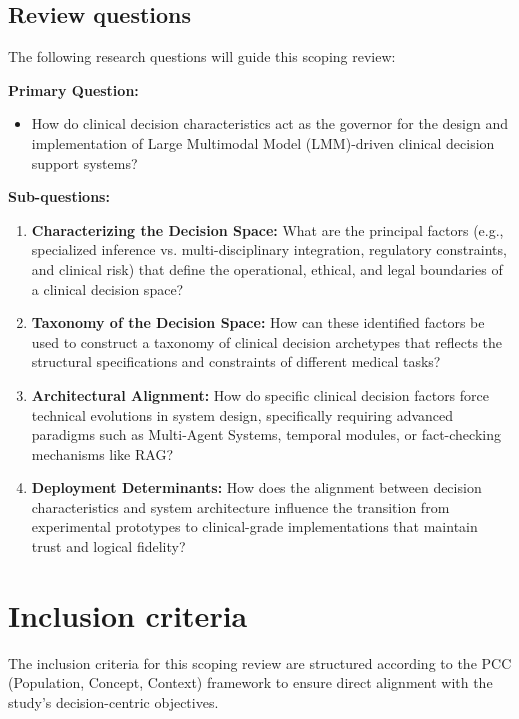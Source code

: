 \documentclass[review,12pt]{elsarticle}
\begin{document}
\subsection{Review questions}

The following research questions will guide this scoping review:

\noindent \textbf{Primary Question:}
\begin{itemize}
\item How do clinical decision characteristics act as the governor for the design and implementation of Large Multimodal Model (LMM)-driven clinical decision support systems?
\end{itemize}

\noindent \textbf{Sub-questions:}
\begin{enumerate}
\item \textbf{Characterizing the Decision Space:} What are the principal factors (e.g., specialized inference vs. multi-disciplinary integration, regulatory constraints, and clinical risk) that define the operational, ethical, and legal boundaries of a clinical decision space?
\item \textbf{Taxonomy of the Decision Space:} How can these identified factors be used to construct a taxonomy of clinical decision archetypes that reflects the structural specifications and constraints of different medical tasks?
\item \textbf{Architectural Alignment:} How do specific clinical decision factors force technical evolutions in system design, specifically requiring advanced paradigms such as Multi-Agent Systems, temporal modules, or fact-checking mechanisms like RAG?
\item \textbf{Deployment Determinants:} How does the alignment between decision characteristics and system architecture influence the transition from experimental prototypes to clinical-grade implementations that maintain trust and logical fidelity?
\end{enumerate}



\section{Inclusion criteria}
\label{inclusion}

The inclusion criteria for this scoping review are structured according to the PCC (Population, Concept, Context) framework to ensure direct alignment with the study's decision-centric objectives.
\end{document}
